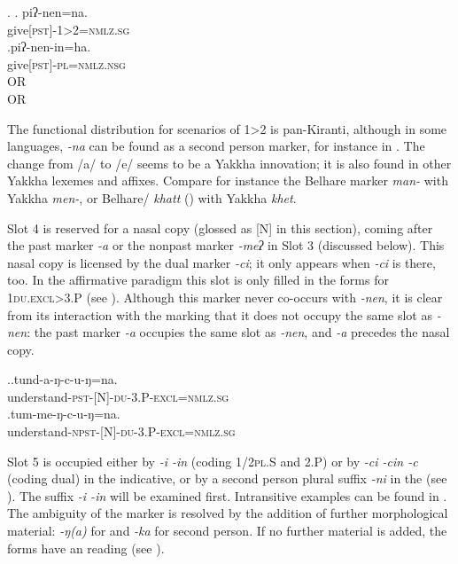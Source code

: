 \ex. \ag. piʔ-nen=na.\\
	give{\scshape [pst]-1>2=nmlz.sg}\\
	\bg.\label{ex-nenin}piʔ-nen-in=ha.\\
	give{\scshape [pst]-pl=nmlz.nsg}\\
	 OR\\
	 OR\\

The functional distribution for scenarios of 1>2 is  pan-Kiranti, although in some languages, \emph{-na} can be found as a second person marker, for instance in  \citep[148]{Lahaussois2002Thulung}. The change from /a/ to /e/ seems to be a Yakkha innovation; it is also found in other Yakkha lexemes and affixes. Compare for instance the Belhare  marker \emph{man-} with Yakkha \emph{men-}, or Belhare/ \emph{khatt} () with Yakkha \emph{khet}. 
	


Slot 4 is reserved for a nasal copy (glossed as {\scshape [N]} in this section), coming after the past marker  \emph{-a} or the nonpast marker \emph{-meʔ} in Slot 3 (discussed below). This nasal copy is licensed by the dual marker \emph{-ci}; it only appears  when \emph{-ci} is there, too. In the affirmative paradigm this slot is only filled in the forms for {\scshape 1du.excl>3.P} (see \Next). Although this marker never co-occurs with \emph{-nen}, it is clear from its interaction with the  marking that it does not occupy the same slot as \emph{-nen}: the past marker \emph{-a} occupies the same slot as \emph{-nen}, and \emph{-a} precedes the nasal copy.

\ex.\ag.tund-a-ŋ-c-u-ŋ=na.\\
understand{\scshape -pst-[N]-du-3.P-excl=nmlz.sg}\\
\bg.tum-me-ŋ-c-u-ŋ=na.\\
understand{\scshape -npst-[N]-du-3.P-excl=nmlz.sg}\\

Slot 5 is occupied either by \emph{-i \ti -in} (coding {\scshape 1/2pl.S} and {\scshape 2.P}) or by \emph{-ci \ti -cin \ti -c} (coding dual) in the indicative, or by a second person plural suffix \emph{-ni} in the  (see ). The suffix \emph{-i \ti -in} will be examined first. Intransitive examples can be found in \Next. The ambiguity of the marker is resolved by the addition of further morphological material: \emph{-ŋ(a)} for  and \emph{-ka} for second person. If no further material is added, the forms have an  reading (see \Next[c]).

